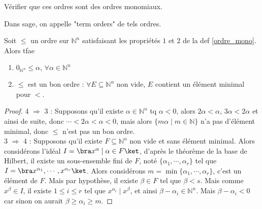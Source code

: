             \begin{exo}
                Vérifier que ces ordres sont des ordres monomiaux.
            \end{exo} \noindent
            Dans sage, on appelle "term orders" de tels ordres.
            \begin{prop}
                Soit $\leq$ un ordre sur $\mathbb{N}^n$ satisfaisant les propriétés $1$ et $2$ de la def \ref{ordre_mono}. Alors tfae
                \begin{enumerate}\addtocounter{enumi}{2}
                    \item $0_{\mathbb{N}^n} \leq \alpha ,\, \forall \alpha \in \mathbb{N}^n$
                    \item $\leq$ est un bon ordre : $\forall E \subseteq \mathbb{N}^n$ non vide, $E$ contient un élément minimal pour $<$.
                \end{enumerate}
            \end{prop}
            \begin{proof}
                4 $\Rightarrow$ 3 : Supposons qu'il existe $\alpha \in \mathbb{N}^n$ tq $\alpha < 0$, alors $2\alpha < \alpha$, $3\alpha < 2\alpha$ et ainsi de suite, donc $\cdots < 2\alpha < \alpha < 0$, mais alors $\{m\alpha \mid m \in \mathbb{N}\}$ n'a pas d'élément minimal, donc $\leq$ n'est pas un bon ordre. \\
                3 $\Rightarrow$ 4 : Supposons qu'il existe $F \subseteq \mathbb{N}^n$ non vide et sans élément minimal. Alors considérons l'idéal $I = \bra x^\alpha \mid \alpha \in F \ket$, d'après le théorème de la base de Hilbert, il existe un sous-ensemble fini de $F$, noté $\{\alpha_1, \cdots, \alpha_r\}$ tel que $I = \bra x^{\alpha_1}, \cdots, x^{\alpha_r}\ket$. Alors considérons $m = \min \{\alpha_1, \cdots, \alpha_r\}$, c'est un élément de $F$. Mais par hypothèse, il existe $\beta \in F$ tel que $\beta < s$. Mais comme $x^\beta \in I$, il existe $1 \leq i \leq r$ tel que $x^{\alpha_i} \mid x^\beta$, et ainsi $\beta - \alpha_i \in \mathbb{N}^n$. Mais $\beta - \alpha_i < 0$ car sinon on aurait $\beta \geq \alpha_i \geq m$. 
            \end{proof}

